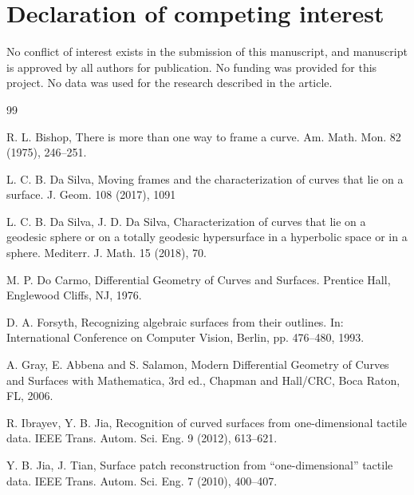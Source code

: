 \documentclass[a4paper,12pt]{amsart}
\theoremstyle{plain}
\theoremstyle{definition}
\begin{document}
 
\section*{Declaration of competing interest}
No conflict of interest exists in the submission of this manuscript, and manuscript is approved by all authors for publication. No
funding was provided for this project. No data was used for the research described in the article.




\begin{thebibliography}{99}

 R. L. Bishop,  There is more than one way to frame a curve. Am. Math. Mon. 82  (1975), 246--251.


 

 L. C. B. Da Silva,  Moving frames and the characterization of curves that lie on a surface. J. Geom. 108 (2017), 1091 

 

 L. C. B. Da Silva, J. D.  Da Silva,   Characterization of curves that lie on a geodesic sphere or on a totally geodesic hypersurface in a hyperbolic space or in a sphere. Mediterr. J. Math. 15  (2018), 70.




 M. P. Do Carmo, Differential Geometry of Curves and Surfaces. Prentice Hall, Englewood Cliffs, NJ, 1976.


  D. A. Forsyth,  Recognizing algebraic surfaces from their outlines. In:  International Conference on Computer Vision, Berlin,   pp. 476--480, 1993.

   A. Gray, E. Abbena and S. Salamon,  Modern Differential Geometry of Curves and Surfaces with Mathematica, 3rd ed., Chapman and Hall/CRC, Boca Raton, FL, 2006.

 R. Ibrayev, Y. B.   Jia, Recognition of curved surfaces from one-dimensional tactile data. IEEE Trans. Autom. Sci. Eng. 9 (2012), 613--621.   



   Y. B. Jia, J.  Tian, Surface patch reconstruction from ``one-dimensional'' tactile data.  IEEE Trans. Autom.  Sci. Eng. 7  (2010), 400--407.





\end{thebibliography}
\end{document}
